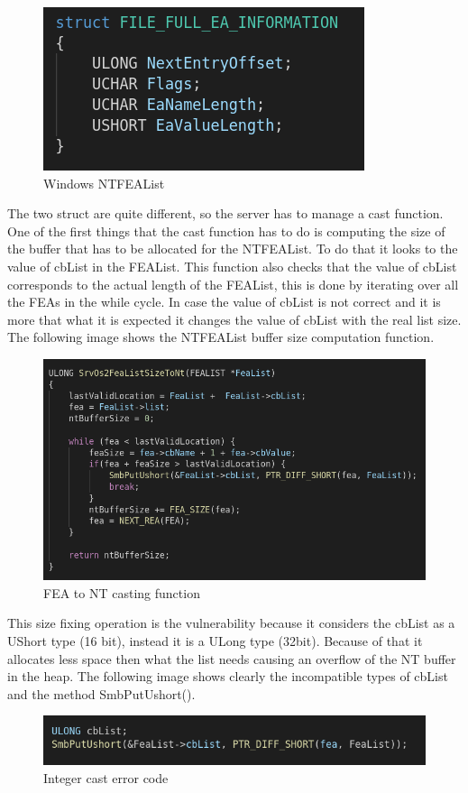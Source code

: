 \begin{figure}[ht!]
  \centering
    \includegraphics[scale=0.5]{images/windows_ea_struct.png}
    \caption{Windows NTFEAList}
\end{figure}
\noindent The two struct are quite different, so the server has to manage a cast function.\\
One of the first things that the cast function has to do is computing the size of the buffer that has to be allocated for the NTFEAList. To do that 
it looks to the value of cbList in the FEAList.
This function also checks that the value of cbList corresponds to the actual length of the FEAList, this is done by iterating over all the FEAs in the while cycle.
In case the value of cbList is not correct and it is more that what it is expected it changes the value of cbList with the real list size.\\
The following image shows the NTFEAList buffer size computation function.

\begin{figure}[ht!]
  \centering
    \includegraphics[scale=0.5]{images/SrvOs2FeaListSizeToNt.png}
    \caption{FEA to NT casting function}
\end{figure}

\noindent This size fixing operation is the vulnerability because it considers the cbList as a UShort type (16 bit), instead it is a ULong type (32bit).
Because of that it allocates less space then what the list needs causing an overflow of the NT buffer in the heap\cite{exploit-db}.
The following image shows clearly the incompatible types of cbList and the method SmbPutUshort().
\begin{figure}[ht!]
  \centering
    \includegraphics[scale=0.5]{images/vulnerable_lines.png}
    \caption{Integer cast error code}
\end{figure}

